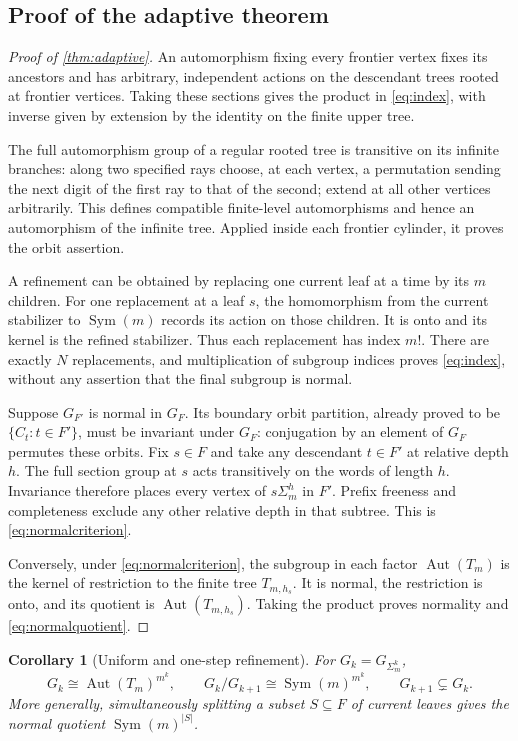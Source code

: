\documentclass[11pt]{article}
\newtheorem{corollary}[theorem]{Corollary}
\theoremstyle{definition}
\theoremstyle{remark}
\newcommand{\Aut}{\operatorname{Aut}}
\newcommand{\Sym}{\operatorname{Sym}}
\begin{document}
\subsection{Proof of the adaptive theorem}
\begin{proof}[Proof of \cref{thm:adaptive}]
An automorphism fixing every frontier vertex fixes its ancestors and has arbitrary, independent actions on the descendant trees rooted at frontier vertices. Taking these sections gives the product in \eqref{eq:index}, with inverse given by extension by the identity on the finite upper tree.

The full automorphism group of a regular rooted tree is transitive on its infinite branches: along two specified rays choose, at each vertex, a permutation sending the next digit of the first ray to that of the second; extend at all other vertices arbitrarily. This defines compatible finite-level automorphisms and hence an automorphism of the infinite tree. Applied inside each frontier cylinder, it proves the orbit assertion.

A refinement can be obtained by replacing one current leaf at a time by its $m$ children. For one replacement at a leaf $s$, the homomorphism from the current stabilizer to $\Sym(m)$ records its action on those children. It is onto and its kernel is the refined stabilizer. Thus each replacement has index $m!$. There are exactly $N$ replacements, and multiplication of subgroup indices proves \eqref{eq:index}, without any assertion that the final subgroup is normal.

Suppose $G_{F'}$ is normal in $G_F$. Its boundary orbit partition, already proved to be $\{C_t:t\in F'\}$, must be invariant under $G_F$: conjugation by an element of $G_F$ permutes these orbits. Fix $s\in F$ and take any descendant $t\in F'$ at relative depth $h$. The full section group at $s$ acts transitively on the words of length $h$. Invariance therefore places every vertex of $s\Sigma_m^h$ in $F'$. Prefix freeness and completeness exclude any other relative depth in that subtree. This is \eqref{eq:normalcriterion}.

Conversely, under \eqref{eq:normalcriterion}, the subgroup in each factor $\Aut(T_m)$ is the kernel of restriction to the finite tree $T_{m,h_s}$. It is normal, the restriction is onto, and its quotient is $\Aut(T_{m,h_s})$. Taking the product proves normality and \eqref{eq:normalquotient}.
\end{proof}

\begin{corollary}[Uniform and one-step refinement]\label{cor:uniform}
For $G_k=G_{\Sigma_m^k}$,
\[
 G_k\cong\Aut(T_m)^{m^k},\qquad
 G_k/G_{k+1}\cong\Sym(m)^{m^k},\qquad G_{k+1}\subsetneq G_k.
\]
More generally, simultaneously splitting a subset $S\subseteq F$ of current leaves gives the normal quotient $\Sym(m)^{|S|}$.
\end{corollary}
\end{document}

